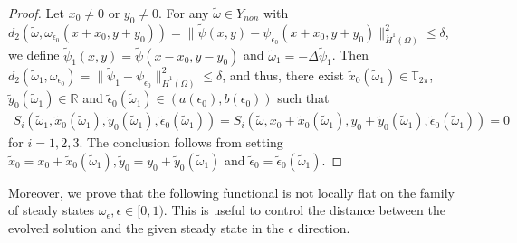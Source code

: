 \documentclass[1 [leqno, 11pt]{amsart}
\numberwithin{equation}{section}
\let\ep=\epsilon
\begin{document}
\begin{CJK*}{GBK}{song}
\begin{proof}
Let $x_0\neq 0$ or $y_0\neq0$. For any $\tilde \omega\in Y_{non}$ with $d_2(\tilde \omega,\omega_{\ep_0}(x+x_0,y+y_0))=\|\tilde\psi(x,y)-\psi_{\ep_0}(x+x_0,y+y_0)\|_{\dot{H}^1(\Omega)}^2\leq \delta$, we define $\tilde \psi_1(x,y)=\tilde \psi(x-x_0,y-y_0)$ and $\tilde \omega_1=-\Delta\tilde \psi_1$. Then $d_2(\tilde \omega_1,\omega_{\ep_0})=\|\tilde\psi_1-\psi_{\ep_0}\|_{\dot{H}^1(\Omega)}^2\leq \delta$, and thus, there exist $\tilde x_0(\tilde\omega_1)\in\mathbb{T}_{2\pi}$, $\tilde y_0(\tilde\omega_1)\in\mathbb{R}$ and $\tilde \epsilon_0(\tilde\omega_1)\in(a(\ep_0),b(\ep_0))$ such that
\begin{align*}
S_i(\tilde\omega_1,\tilde x_0(\tilde\omega_1), \tilde y_0(\tilde\omega_1),\tilde \ep_0(\tilde\omega_1))=S_i(\tilde\omega,x_0+\tilde x_0(\tilde\omega_1), y_0+\tilde y_0(\tilde\omega_1),\tilde\ep_0(\tilde\omega_1))=0
\end{align*}
 for $i=1,2,3$. The conclusion follows from setting $\tilde x_0=x_0+\tilde x_0(\tilde \omega_1), \tilde y_0=y_0+\tilde y_0(\tilde \omega_1)$ and $\tilde\ep_0=\tilde \ep_0(\tilde \omega_1)$.
\end{proof}

Moreover, we prove that the following functional is not locally flat on the family of steady states $\omega_{\ep}, \ep\in[0,1)$. This is useful to control the distance between  the evolved solution and the given steady state  in the $\ep$ direction.


\end{CJK*}
\end{document}
